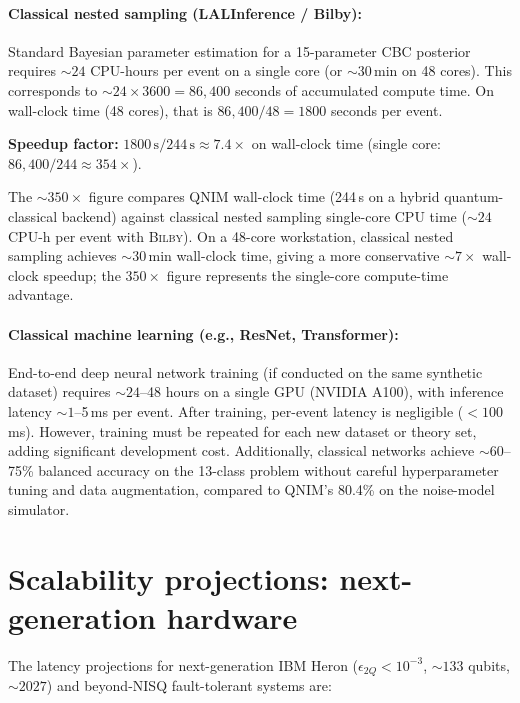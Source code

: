 \documentclass[11pt,a4paper, english]{book}
\theoremstyle{plain}
\theoremstyle{definition}
\numberwithin{equation}{chapter}
\numberwithin{figure}{chapter}
\numberwithin{table}{chapter}
\begin{document}
\paragraph{Classical nested sampling (LALInference / Bilby):}
Standard Bayesian parameter estimation for a 15-parameter CBC posterior requires 
$\sim 24$ CPU-hours per event on a single core (or $\sim 30$\,min on 48 cores). 
This corresponds to $\sim 24 \times 3600 = 86,400$ seconds of accumulated compute 
time. On wall-clock time (48 cores), that is $86,400 / 48 = 1800$ seconds per 
event.

\textbf{Speedup factor:} $1800\,\mathrm{s} / 244\,\mathrm{s} \approx 7.4\times$ 
on wall-clock time (single core: $86,400 / 244 \approx 354\times$).

The $\sim\!350\times$ figure compares QNIM wall-clock 
time (244\,s on a hybrid quantum-classical backend) 
against classical nested sampling single-core CPU time 
($\sim\!24$\,CPU-h per event with \textsc{Bilby}). 
On a 48-core workstation, classical nested sampling 
achieves $\sim\!30$\,min wall-clock time, giving a 
more conservative $\sim\!7\times$ wall-clock speedup; 
the $350\times$ figure represents the single-core 
compute-time advantage.

\paragraph{Classical machine learning (e.g., ResNet, Transformer):}
End-to-end deep neural network training (if conducted on the same synthetic 
dataset) requires $\sim 24$--48 hours on a single GPU (NVIDIA A100), with inference 
latency $\sim 1$--5\,ms per event. After training, per-event latency is negligible 
($< 100$\,ms). However, training must be repeated for each new dataset or theory 
set, adding significant development cost. Additionally, classical networks achieve 
$\sim 60$--75\% balanced accuracy on the 13-class problem without careful hyperparameter 
tuning and data augmentation, compared to QNIM's 80.4\% on the noise-model simulator.

\section{Scalability projections: next-generation hardware}
\label{sec:heron-projection}

The latency projections for next-generation IBM Heron ($\epsilon_{2Q} < 10^{-3}$, 
$\sim 133$ qubits, $\sim 2027$) and beyond-NISQ fault-tolerant systems are:
\end{document}
